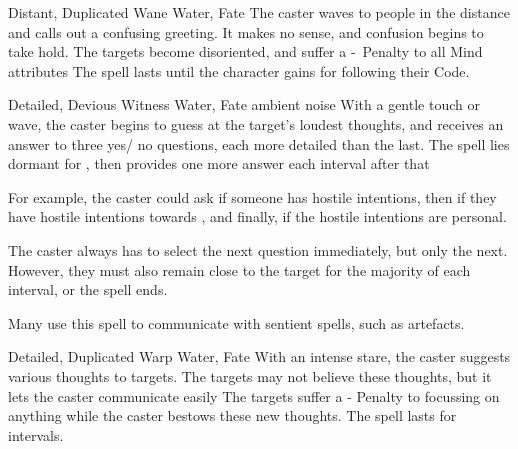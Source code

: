 \ifodd\value{diceNo}

  {Distant, Duplicated}%
  {Wane}%
  {Water, Fate}%
  {}%
  {
    The caster waves to people in the distance and calls out a confusing greeting.
    It makes no sense, and confusion begins to take hold.
    The targets become disoriented, and suffer a -~Penalty to all Mind \glspl{attribute}}%
  {
    The spell lasts until the character gains  for following their Code.
  }

\else

  {Detailed, Devious}%
  {Witness}%
  {Water, Fate}%
  {ambient noise}%
  {With a gentle touch or wave, the caster begins to guess at the target's loudest thoughts, and receives an answer to three yes/ no questions, each more detailed than the last.
  The spell lies dormant for , then provides one more answer each interval after that}%
  {
  For example, the caster could ask if someone has hostile intentions, then if they have hostile intentions towards , and finally, if the hostile intentions are personal.

  The caster always has to select the next question immediately, but only the next.
  However, they must also remain close to the target for the majority of each \gls{interval}, or the spell ends.

  Many use this spell to communicate with sentient spells, such as \glspl{artefact}.}

  {Detailed, Duplicated}%
  {Warp}%
  {Water, Fate}%
  {}%
  {With an intense stare, the caster suggests various thoughts to  targets.
  The targets may not believe these thoughts, but it lets the caster communicate easily}%
  {The targets suffer a - Penalty to focussing on anything while the caster bestows these new thoughts.
  The spell lasts for  \glspl{interval}.}

\fi
{}
